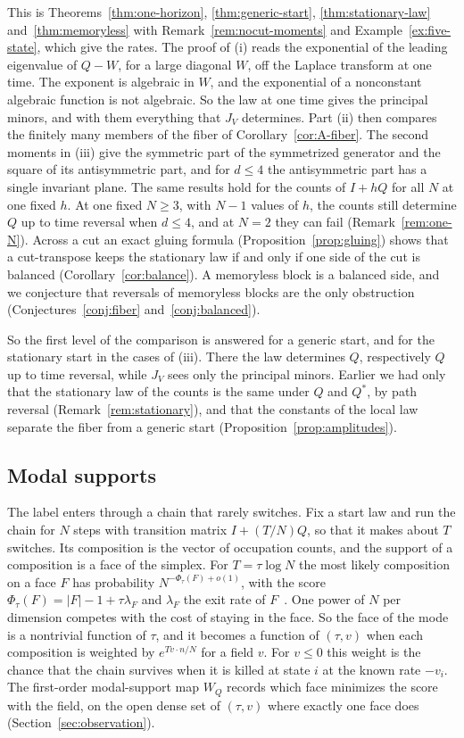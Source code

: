 This is Theorems~\ref{thm:one-horizon}, \ref{thm:generic-start}, \ref{thm:stationary-law}
and~\ref{thm:memoryless} with Remark~\ref{rem:nocut-moments} and Example~\ref{ex:five-state},
which give the rates. The proof of (i) reads the exponential of the leading eigenvalue of $Q-W$, for a large
diagonal $W$, off the Laplace transform at one time. The exponent is algebraic in $W$, and the
exponential of a nonconstant algebraic function is not algebraic. So the law at one time gives the
principal minors, and with them everything that $J_V$ determines. Part (ii) then compares the
finitely many members of the fiber of Corollary~\ref{cor:A-fiber}. The second moments in (iii)
give the symmetric part of the symmetrized generator and the square of its antisymmetric part,
and for $d\le4$ the antisymmetric part has a single invariant plane. The same results hold for the
counts of $I+hQ$ for all $N$ at one fixed $h$. At one fixed $N\ge3$, with $N-1$ values of $h$,
the counts still determine $Q$ up to time reversal when $d\le4$, and at $N=2$ they can fail
(Remark~\ref{rem:one-N}). Across a cut an exact gluing formula
(Proposition~\ref{prop:gluing}) shows that a cut-transpose keeps the stationary law if and only if
one side of the cut is balanced (Corollary~\ref{cor:balance}). A memoryless block is a balanced
side, and we conjecture that reversals of memoryless blocks are the only obstruction
(Conjectures~\ref{conj:fiber} and~\ref{conj:balanced}).

So the first level of the comparison is answered for a generic start, and for the stationary
start in the cases of (iii). There the law determines $Q$, respectively $Q$ up to time reversal,
while $J_V$ sees only the principal minors. Earlier we had only that the stationary law of the counts is the
same under $Q$ and $Q^*$, by path reversal (Remark~\ref{rem:stationary}), and that the constants of
the local law separate the fiber from a generic start (Proposition~\ref{prop:amplitudes}).

\subsection{Modal supports}\label{sec:intro-modal}

The label enters through a chain that rarely switches. Fix a start law and run the chain for $N$
steps with transition matrix $I+(T/N)Q$, so that it makes about $T$ switches. Its composition is
the vector of occupation counts, and the support of a composition is a face of the simplex. For
$T=\tau\log N$ the most likely composition on a face $F$ has probability
$N^{-\Phi_\tau(F)+o(1)}$, with the score $\Phi_\tau(F)=|F|-1+\tau\lambda_F$ and $\lambda_F$ the
exit rate of $F$~\cite{paperC1}. One power of $N$ per dimension competes with the cost of staying
in the face. So the face of the mode is a nontrivial function of $\tau$, and it becomes a function
of $(\tau,v)$ when each composition is weighted by $e^{Tv\cdot n/N}$ for a field $v$. For $v\le0$
this weight is the chance that the chain survives when it is killed at state $i$ at the known rate
$-v_i$. The first-order modal-support map $W_Q$ records which face minimizes the score with the
field, on the open dense set of $(\tau,v)$ where exactly one face does
(Section~\ref{sec:observation}).

